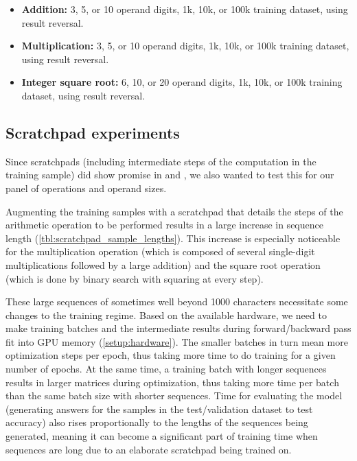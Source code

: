 \begin{itemize}
	\item \textbf{Addition:} 3, 5, or 10 operand digits, 1k, 10k, or 100k training dataset, using result reversal.
	\item \textbf{Multiplication:} 3, 5, or 10 operand digits, 1k, 10k, or 100k training dataset, using result reversal.
	\item \textbf{Integer square root:} 6, 10, or 20 operand digits, 1k, 10k, or 100k training dataset, using result reversal.
\end{itemize}

\subsection{Scratchpad experiments}
\label{setup:scratchpad}

Since scratchpads (including intermediate steps of the computation in the training sample) did show promise in \cite{teaching} and \cite{goat}, we also wanted to test this for our panel of operations and operand sizes.

Augmenting the training samples with a scratchpad that details the steps of the arithmetic operation to be performed results in a large increase in sequence length (\cref{tbl:scratchpad_sample_lengths}). This increase is especially noticeable for the multiplication operation (which is composed of several single-digit multiplications followed by a large addition) and the square root operation (which is done by binary search with squaring at every step).

These large sequences of sometimes well beyond 1000 characters necessitate some changes to the training regime. Based on the available hardware, we need to make training batches and the intermediate results during forward/backward pass fit into GPU memory (\cref{setup:hardware}). The smaller batches in turn mean more optimization steps per epoch, thus taking more time to do training for a given number of epochs. At the same time, a training batch with longer sequences results in larger matrices during optimization, thus taking more time per batch than the same batch size with shorter sequences.
Time for evaluating the model (generating answers for the samples in the test/validation dataset to test accuracy) also rises proportionally to the lengths of the sequences being generated, meaning it can become a significant part of training time when sequences are long due to an elaborate scratchpad being trained on.

